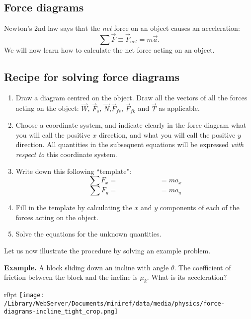 \documentclass[letterpaper,9pt,journal]{IEEEtran}
\newcommand{\be}{\begin{equation}}
\newcommand{\ee}{\end{equation}}
\begin{document}
\subsection{Force diagrams}

Newton's 2nd law says that the \emph{net} force on an object causes an acceleration:
\be
 \sum \vec{F}  \equiv \vec{F}_{net} = m\vec{a}.
 \label{FeqMA}
\ee
We will now learn how to calculate the net force acting on an object.

\vspace{-3mm}
\subsection{Recipe for solving force diagrams}
\label{31bb2b3f8fca76563afa16cf8fbccb90}%

\begin{enumerate}
\item  Draw a diagram centred on the object. Draw all the vectors of all the forces acting on the object:
    $\vec{W}$, $\vec{F}_{s}$, $\vec{N}$,$\vec{F}_{fs}$, $\vec{F}_{fk}$ and  $\vec{T}$ as applicable.
\item  Choose a coordinate system, and indicate clearly in the force diagram what you will call the positive $x$ direction, 
and what you will call the positive $y$ direction. All quantities in the subsequent equations will be expressed \emph{with respect to} this coordinate system.
\item  Write down this following ``template'': \[ \sum F_x = \qquad \qquad \qquad = ma_x \]   \[ \sum F_y = \qquad \qquad \qquad = ma_y \]
\item   Fill in the template by calculating the $x$ and $y$ components of each of the forces acting on the object.
\item  Solve the equations for the unknown quantities.
\end{enumerate}

Let us now illustrate the procedure by solving an example problem.

{\bf Example.} %
A block sliding down an incline with angle $\theta$. The coefficient of friction between the block and the incline is  $\mu_k$.
What is its acceleration?

\begin{wrapfigure}{r}{0pt}
\centering
\texttt{[image: /Library/WebServer/Documents/miniref/data/media/physics/force-diagrams-incline\_tight\_crop.png]}
\end{wrapfigure}
\end{document}
